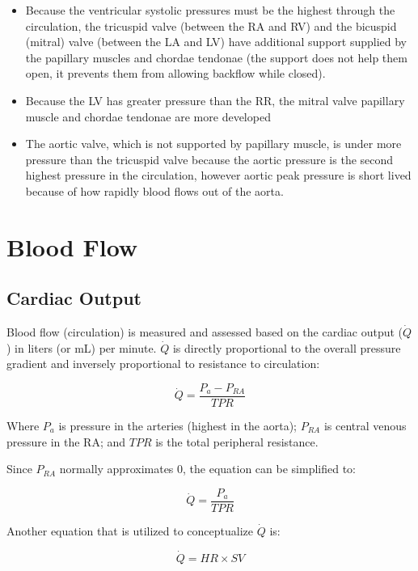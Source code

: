 \begin{itemize}
    \item Because the ventricular systolic pressures must be the highest through the circulation, the tricuspid valve (between the RA and RV) and the bicuspid (mitral) valve (between the LA and LV) have additional support supplied by the papillary muscles and chordae tendonae (the support does not help them open, it prevents them from allowing backflow while closed).
    \item Because the LV has greater pressure than the RR, the mitral valve papillary muscle and chordae tendonae are more developed
    \item The aortic valve, which is not supported by papillary muscle, is under more pressure than the tricuspid valve because the aortic pressure is the second highest pressure in the circulation, however aortic peak pressure is short lived because of how rapidly blood flows out of the aorta.
\end{itemize}

\section{Blood Flow}

\subsection{Cardiac Output}

Blood flow (circulation) is measured and assessed based on the cardiac output ($\dot{Q}$) in liters (or mL) per minute. $\dot{Q}$ is directly proportional to the overall pressure gradient and inversely proportional to resistance to circulation:

\begin{equation}
    \dot{Q} = \frac{P_{a} - P_{RA}}{TPR}
    \label{Q}
\end{equation}

Where $P_{a}$ is pressure in the arteries (highest in the aorta); $P_{RA}$ is central venous pressure in the RA; and $TPR$ is the total peripheral resistance.

Since $P_{RA}$ normally approximates 0, the equation can be simplified to:

\begin{equation}
    \dot{Q} = \frac{P_{a}}{TPR}
    \label{Q_simplified}
\end{equation}

Another equation that is utilized to conceptualize $\dot{Q}$ is:

\begin{equation}
    \dot{Q} = HR \times SV
    \label{Q_HRSV}
\end{equation}

